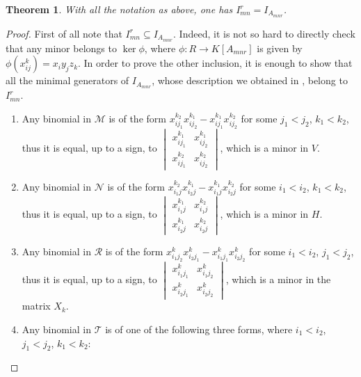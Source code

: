 \documentclass[12pt]{amsart}
\numberwithin{equation}{section}
\newtheorem{theorem}{Theorem}[section]
\theoremstyle{definition}
\begin{document}
\begin{theorem}
  \label{thm: toric presentation}
  With all the notation as above, one has $I_{mn}^r=I_{A_{mnr}}$.
  \end{theorem}
  \begin{proof} 
   First of all note that $I_{mn}^r\subseteq I_{A_{mnr}}$. Indeed, it is not so hard to directly check that any minor belongs to $\ker \phi$, where $\phi: R\to K[A_{mnr}]$ is given by $\phi(x_{ij}^k)=x_iy_jz_k$. In order to prove the other inclusion, it is enough to show that all the minimal generators of $I_{A_{mnr}}$, whose description we obtained in , belong to $I_{mn}^r$.
   \begin{enumerate}
       \item Any binomial in $\mathcal M$ is of the form $x_{ij_1}^{k_2}x_{ij_2}^{k_1}-x_{ij_1}^{k_1}x_{ij_2}^{k_2}$ for some $j_1<j_2$, $k_1<k_2$, thus it is equal, up to a sign,  to  $\begin{vmatrix}
    x_{ij_1}^{k_1} & x_{ij_2}^{k_1} \\[1ex]
     x_{ij_1}^{k_2}   &x_{ij_2}^{k_2}
    \end{vmatrix}$, which is a minor in $V.$ 
\item Any binomial in $\mathcal N$ is of the form $x_{i_1j}^{k_2}x_{i_2j}^{k_1}-x_{i_1j}^{k_1}x_{i_2j}^{k_2}$ for some $i_1<i_2$, $k_1<k_2$, thus it is equal, up to a sign, to  $\begin{vmatrix}
    x_{i_1j}^{k_1} & x_{i_1j}^{k_2} \\[1ex]
     x_{i_2j}^{k_1}   &x_{i_2j}^{k_2}
    \end{vmatrix}$, which is a minor in $H$.
\item Any binomial in $\mathcal R$ is of the form $x_{i_1j_2}^{k}x_{i_2j_1}^{k}-x_{i_1j_1}^{k}x_{i_2j_2}^{k}$ for some $i_1<i_2$, $j_1<j_2$, thus it is equal, up to a sign, to $\begin{vmatrix}
    x_{i_1j_1}^{k} & x_{i_1j_2}^{k} \\[1ex]
     x_{i_2j_1}^{k} &x_{i_2j_2}^{k}
    \end{vmatrix}$, which is a minor in the matrix $X_k$.
    \item Any binomial in $\mathcal T$ is of one of the following three forms, where $i_1<i_2$, $j_1<j_2$, $k_1<k_2$:
\end{enumerate}
\end{proof}
\end{document}
